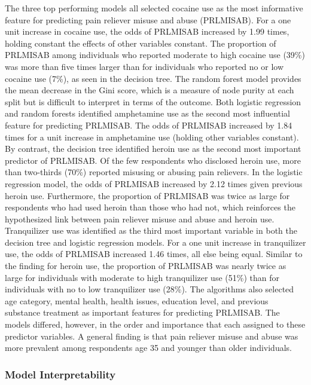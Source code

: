 \documentclass[sigconf]{acmart}
\begin{document}
The three top performing models all selected cocaine use as the most 
informative feature for predicting pain reliever misuse and abuse (PRLMISAB). 
For a one unit increase in cocaine use, the odds of PRLMISAB increased by 1.99 
times, holding constant the effects of other variables constant. The proportion 
of PRLMISAB among individuals who reported moderate to high cocaine use (39\%) 
was more than five times larger than for individuals who reported no or 
low cocaine use (7\%), as seen in the decision tree. The random forest model 
provides the mean decrease in the Gini score, which is a measure of node purity 
at each split but is difficult to interpret in terms of the outcome. Both 
logistic regression and random forests identified amphetamine use as the 
second most influential feature for predicting PRLMISAB. The odds of PRLMISAB 
increased by 1.84 times for a unit increase in amphetamine use (holding other 
variables constant). By contrast, the decision tree identified heroin use as 
the second most important predictor of PRLMISAB. Of the few respondents who 
disclosed heroin use, more than two-thirds (70\%) reported misusing or abusing 
pain relievers. In the logistic regression model, the odds of PRLMISAB 
increased by 2.12 times given previous heroin use. Furthermore, the 
proportion of PRLMISAB was twice as large for respondents who had used heroin 
than those who had not, which reinforces the hypothesized link between pain 
reliever misuse and abuse and heroin use. Tranquilizer use was identified as 
the third most important variable in both the decision tree and logistic 
regression models. For a one unit increase in tranquilizer use, the odds of 
PRLMISAB increased 1.46 times, all else being equal. Similar to the finding 
for heroin use, the proportion of PRLMISAB was nearly twice as large for 
individuals with moderate to high tranquilizer use (51\%) than for individuals 
with no to low tranquilizer use (28\%). The algorithms also selected age 
category, mental health, health issues, education level, and previous 
substance treatment as important features for predicting PRLMISAB. The models
differed, however, in the order and importance that each assigned to these 
predictor variables. A general finding is that pain reliever misuse and abuse 
was more prevalent among respondents age 35 and younger than older individuals. 


\subsubsection{Model Interpretability}
\end{document}
